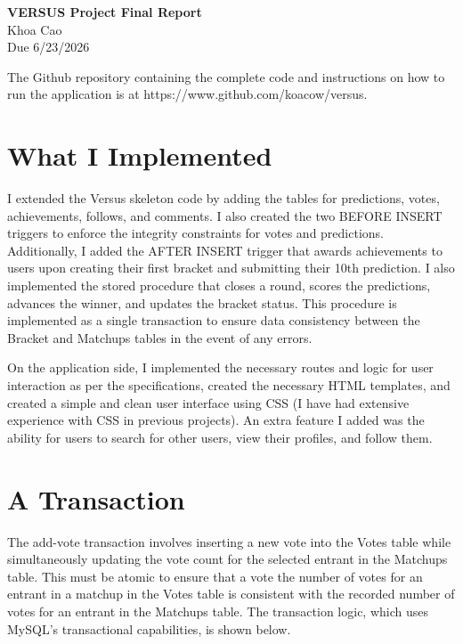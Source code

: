 \documentclass[11pt]{article}
\begin{document}
\begin{center}
    \textbf{VERSUS Project Final Report} \\
    Khoa Cao \\
    Due 6/23/2026
\end{center}

The Github repository containing the complete code and instructions on how to run the application is at https://www.github.com/koacow/versus.

\section{What I Implemented}

I extended the Versus skeleton code by adding the tables for predictions, votes, achievements, follows, and comments. I also created the two BEFORE INSERT
triggers to enforce the integrity constraints for votes and predictions. Additionally, I added the AFTER INSERT trigger that awards achievements to users upon
creating their first bracket and submitting their 10th prediction. I also implemented the stored procedure that closes a round, scores the predictions, 
advances the winner, and updates the bracket status. This procedure is implemented as a single transaction to ensure data consistency between the Bracket and Matchups tables in the event of any errors.

On the application side, I implemented the necessary routes and logic for user interaction as per the specifications, created the necessary HTML templates, and 
created a simple and clean user interface using CSS (I have had extensive experience with CSS in previous projects). An extra feature I added was the ability 
for users to search for other users, view their profiles, and follow them.

\section{A Transaction}
The add-vote transaction involves inserting a new vote into the Votes table while simultaneously updating the vote count for the selected entrant in the Matchups table. 
This must be atomic to ensure that a vote the number of votes for an entrant in a matchup in the Votes table is consistent with the recorded
number of votes for an entrant in the Matchups table. The transaction logic, which uses MySQL's transactional capabilities, is shown below.
\end{document}
